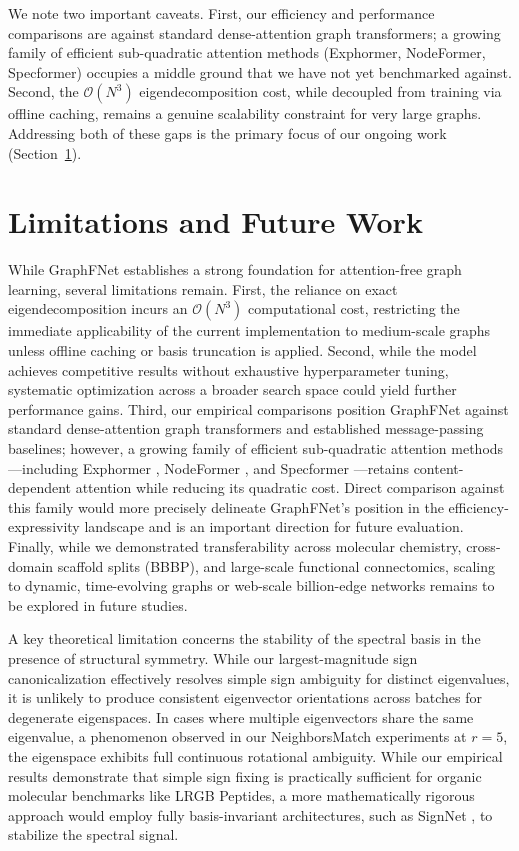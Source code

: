 \documentclass[10pt]{article}
\begin{document}
We note two important caveats. First, our efficiency and performance comparisons are against standard dense-attention graph transformers; a growing family of efficient sub-quadratic attention methods (Exphormer, NodeFormer, Specformer) occupies a middle ground that we have not yet benchmarked against. Second, the $\mathcal{O}(N^3)$ eigendecomposition cost, while decoupled from training via offline caching, remains a genuine scalability constraint for very large graphs. Addressing both of these gaps is the primary focus of our ongoing work (Section~\ref{sec:limitations}).

\section{Limitations and Future Work}
\label{sec:limitations}

While GraphFNet establishes a strong foundation for attention-free graph learning, several limitations remain. First, the reliance on exact eigendecomposition incurs an $\mathcal{O}(N^3)$ computational cost, restricting the immediate applicability of the current implementation to medium-scale graphs unless offline caching or basis truncation is applied. Second, while the model achieves competitive results without exhaustive hyperparameter tuning, systematic optimization across a broader search space could yield further performance gains. Third, our empirical comparisons position GraphFNet against standard dense-attention graph transformers and established message-passing baselines; however, a growing family of efficient sub-quadratic attention methods---including Exphormer \citep{shirzad2023exphormer}, NodeFormer \citep{wu2022nodeformer}, and Specformer \citep{bo2023specformer}---retains content-dependent attention while reducing its quadratic cost. Direct comparison against this family would more precisely delineate GraphFNet's position in the efficiency-expressivity landscape and is an important direction for future evaluation. Finally, while we demonstrated transferability across molecular chemistry, cross-domain scaffold splits (BBBP), and large-scale functional connectomics, scaling to dynamic, time-evolving graphs or web-scale billion-edge networks remains to be explored in future studies.

A key theoretical limitation concerns the stability of the spectral basis in the presence of structural symmetry. While our largest-magnitude sign canonicalization effectively resolves simple sign ambiguity for distinct eigenvalues, it is unlikely to produce consistent eigenvector orientations across batches for degenerate eigenspaces. In cases where multiple eigenvectors share the same eigenvalue, a phenomenon observed in our NeighborsMatch experiments at $r=5$, the eigenspace exhibits full continuous rotational ambiguity. While our empirical results demonstrate that simple sign fixing is practically sufficient for organic molecular benchmarks like LRGB Peptides, a more mathematically rigorous approach would employ fully basis-invariant architectures, such as SignNet \citep{lim2023signnet}, to stabilize the spectral signal.
\end{document}
